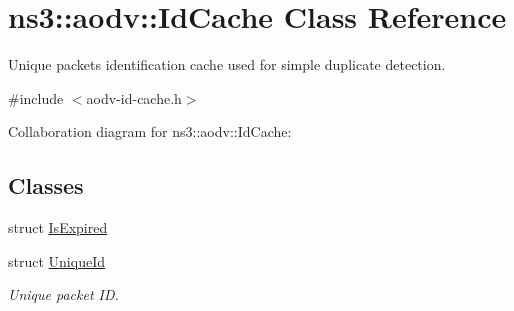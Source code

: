 \hypertarget{classns3_1_1aodv_1_1IdCache}{}\section{ns3\+:\+:aodv\+:\+:Id\+Cache Class Reference}
\label{classns3_1_1aodv_1_1IdCache}


Unique packets identification cache used for simple duplicate detection.  




{\ttfamily \#include $<$aodv-\/id-\/cache.\+h$>$}



Collaboration diagram for ns3\+:\+:aodv\+:\+:Id\+Cache\+:
\subsection*{Classes}
\begin{DoxyCompactItemize}
\item 
struct \hyperlink{structns3_1_1aodv_1_1IdCache_1_1IsExpired}{Is\+Expired}
\item 
struct \hyperlink{structns3_1_1aodv_1_1IdCache_1_1UniqueId}{Unique\+Id}
\begin{DoxyCompactList}\small\item\em Unique packet ID. \end{DoxyCompactList}\end{DoxyCompactItemize}
